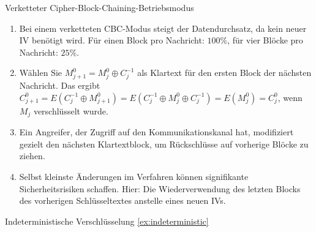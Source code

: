 \documentclass{article}
\begin{document}
\begin{exercise}{Verketteter Cipher-Block-Chaining-Betriebsmodus}
  \begin{solution}
    \begin{enumerate}
        \item Bei einem verketteten CBC-Modus steigt der Datendurchsatz, da kein neuer IV benötigt wird. Für einen Block pro Nachricht: $100\%$, für vier Blöcke pro Nachricht: $25\%$.
        \item Wählen Sie $M_{j+1}^0=M_j^0 \oplus C_j^{-1}$ als Klartext für den ersten Block der nächsten Nachricht. Das ergibt $C_{j+1}^0=E(C_j^{-1} \oplus M_{j+1}^0)=E(C_j^{-1} \oplus M_j^0 \oplus C_j^{-1})=E(M_j^0)=C_j^0$, wenn $M_j$ verschlüsselt wurde.
        \item Ein Angreifer, der Zugriff auf den Kommunikationskanal hat, modifiziert gezielt den nächsten Klartextblock, um Rückschlüsse auf vorherige Blöcke zu ziehen.
        \item Selbst kleinste Änderungen im Verfahren können signifikante Sicherheitsrisiken schaffen. Hier: Die Wiederverwendung des letzten Blocks des vorherigen Schlüsseltextes anstelle eines neuen IVs.
    \end{enumerate}
  \end{solution}
\end{exercise}

\begin{exercise}{Indeterministische Verschlüsselung \ref{ex:indeterministic}}\end{exercise}
\end{document}
